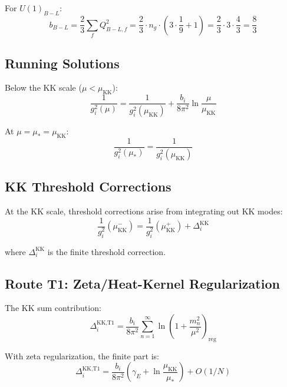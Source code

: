 \documentclass[11pt,a4paper]{article}
\begin{document}
For $U(1)_{B-L}$:
\begin{equation}
\label{eq:b-BL}
b_{B-L} = \frac{2}{3} \sum_f Q_{B-L,f}^2 = \frac{2}{3} \cdot n_g \cdot \left(3 \cdot \frac{1}{9} + 1\right) = \frac{2}{3} \cdot 3 \cdot \frac{4}{3} = \frac{8}{3}
\end{equation}

\subsection{Running Solutions}
\label{subsec:running-solutions}

Below the KK scale ($\mu < \mu_{\text{KK}}$):
\begin{equation}
\label{eq:running-below-kk}
\frac{1}{g_i^2(\mu)} = \frac{1}{g_i^2(\mu_{\text{KK}})} + \frac{b_i}{8\pi^2} \ln\frac{\mu}{\mu_{\text{KK}}}
\end{equation}

At $\mu = \mu_* = \mu_{\text{KK}}$:
\begin{equation}
\label{eq:at-mu-star}
\frac{1}{g_i^2(\mu_*)} = \frac{1}{g_i^2(\mu_{\text{KK}})}
\end{equation}

\subsection{KK Threshold Corrections}
\label{subsec:kk-thresholds}

At the KK scale, threshold corrections arise from integrating out KK modes:
\begin{equation}
\label{eq:threshold-general}
\frac{1}{g_i^2}(\mu_{\text{KK}}^-) = \frac{1}{g_i^2}(\mu_{\text{KK}}^+) + \Delta_i^{\text{KK}}
\end{equation}

where $\Delta_i^{\text{KK}}$ is the finite threshold correction.

\subsection{Route T1: Zeta/Heat-Kernel Regularization}
\label{subsec:route-t1}

The KK sum contribution:
\begin{equation}
\label{eq:kk-sum-t1}
\Delta_i^{\text{KK,T1}} = \frac{b_i}{8\pi^2} \sum_{n=1}^{\infty} \ln\left(1 + \frac{m_n^2}{\mu^2}\right)_{\text{reg}}
\end{equation}

With zeta regularization, the finite part is:
\begin{equation}
\label{eq:t1-result}
\Delta_i^{\text{KK,T1}} = \frac{b_i}{8\pi^2} \left(\gamma_E + \ln\frac{\mu_{\text{KK}}}{\mu_*}\right) + O(1/N)
\end{equation}
\end{document}
